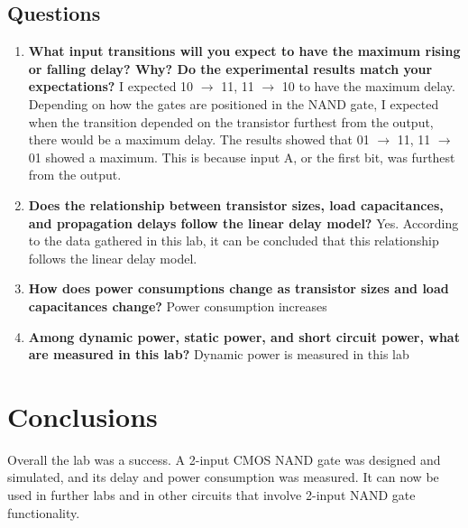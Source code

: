 \documentclass[12pt]{article}
\begin{document}
\subsection{Questions}
	\begin{enumerate}
		\item \textbf{What input transitions will you expect to have the maximum rising or falling delay? Why? Do the experimental results match your expectations?} I expected 10 $\to$ 11, 11 $\to$ 10 to have the maximum delay. Depending on how the gates are positioned in the NAND gate, I expected when the transition depended on the transistor furthest from the output, there would be a maximum delay. The results showed that 01 $\to$ 11, 11 $\to$ 01 showed a maximum. This is because input A, or the first bit, was furthest from the output.
		
		\item \textbf{Does the relationship between transistor sizes, load capacitances, and propagation delays follow the linear delay model?} Yes. According to the data gathered in this lab, it can be concluded that this relationship follows the linear delay model.
		
		\item \textbf{How does power consumptions change as transistor sizes and load capacitances change?} Power consumption increases
		
		\item \textbf{Among dynamic power, static power, and short circuit power, what are measured in this lab?} Dynamic power is measured in this lab
	\end{enumerate}
\section{Conclusions}
Overall the lab was a success. A 2-input CMOS NAND gate was designed and simulated, and its delay and power consumption was measured. It can now be used in further labs and in other circuits that involve 2-input NAND gate functionality.
\end{document}
